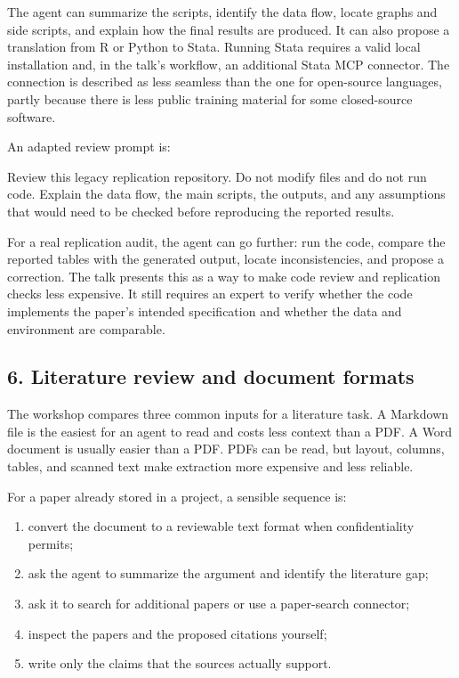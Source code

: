 \documentclass[
  english,
  10pt,
]{article}
\newenvironment{Shaded}{\begin{snugshade}}{\end{snugshade}}
\newcommand{\NormalTok}[1]{\textcolor[rgb]{0.00,0.23,0.31}{#1}}
\providecommand{\tightlist}{%
  \setlength{\itemsep}{0pt}\setlength{\parskip}{0pt}}
\begin{document}
The agent can summarize the scripts, identify the data flow, locate
graphs and side scripts, and explain how the final results are produced.
It can also propose a translation from R or Python to Stata. Running
Stata requires a valid local installation and, in the talk's workflow,
an additional Stata MCP connector. The connection is described as less
seamless than the one for open-source languages, partly because there is
less public training material for some closed-source software.

An adapted review prompt is:

\begin{Shaded}
\begin{Highlighting}[]
\NormalTok{Review this legacy replication repository. Do not modify files and do not run code.}
\NormalTok{Explain the data flow, the main scripts, the outputs, and any assumptions that}
\NormalTok{would need to be checked before reproducing the reported results.}
\end{Highlighting}
\end{Shaded}

For a real replication audit, the agent can go further: run the code,
compare the reported tables with the generated output, locate
inconsistencies, and propose a correction. The talk presents this as a
way to make code review and replication checks less expensive. It still
requires an expert to verify whether the code implements the paper's
intended specification and whether the data and environment are
comparable.

\subsection{6. Literature review and document
formats}\label{literature-review-and-document-formats}

The workshop compares three common inputs for a literature task. A
Markdown file is the easiest for an agent to read and costs less context
than a PDF. A Word document is usually easier than a PDF. PDFs can be
read, but layout, columns, tables, and scanned text make extraction more
expensive and less reliable.

For a paper already stored in a project, a sensible sequence is:

\begin{enumerate}
\def\labelenumi{\arabic{enumi}.}
\tightlist
\item
  convert the document to a reviewable text format when confidentiality
  permits;
\item
  ask the agent to summarize the argument and identify the literature
  gap;
\item
  ask it to search for additional papers or use a paper-search
  connector;
\item
  inspect the papers and the proposed citations yourself;
\item
  write only the claims that the sources actually support.
\end{enumerate}
\end{document}
